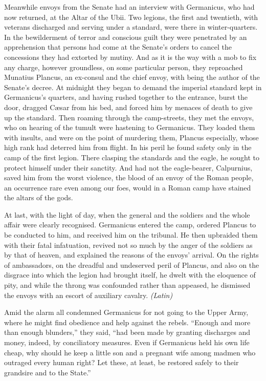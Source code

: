 
Meanwhile envoys from the Senate had an interview with Germanicus, who had now returned, at the Altar of the Ubii. Two legions, the first and twentieth, with veterans discharged and serving under a standard, were there in winter-quarters. In the bewilderment of terror and conscious guilt they were penetrated by an apprehension that persons had come at the Senate's orders to cancel the concessions they had extorted by mutiny. And as it is the way with a mob to fix any charge, however groundless, on some particular person, they reproached Munatius Plancus, an ex-consul and the chief envoy, with being the author of the Senate's decree. At midnight they began to demand the imperial standard kept in Germanicus's quarters, and having rushed together to the entrance, burst the door, dragged Cæsar from his bed, and forced him by menaces of death to give up the standard. Then roaming through the camp-streets, they met the envoys, who on hearing of the tumult were hastening to Germanicus. They loaded them with insults, and were on the point of murdering them, Plancus especially, whose high rank had deterred him from flight. In his peril he found safety only in the camp of the first legion. There clasping the standards and the eagle, he sought to protect himself under their sanctity. And had not the eagle-bearer, Calpurnius, saved him from the worst violence, the blood of an envoy of the Roman people, an occurrence rare even among our foes, would in a Roman camp have stained the altars of the gods.

At last, with the light of day, when the general and the soldiers and the whole affair were clearly recognised. Germanicus entered the camp, ordered Plancus to be conducted to him, and received him on the tribunal. He then upbraided them with their fatal infatuation, revived not so much by the anger of the soldiers as by that of heaven, and explained the reasons of the envoys' arrival. On the rights of ambassadors, on the dreadful and undeserved peril of Plancus, and also on the disgrace into which the legion had brought itself, he dwelt with the eloquence of pity, and while the throng was confounded rather than appeased, he dismissed the envoys with an escort of auxiliary cavalry. \emph{(Latin)}


Amid the alarm all condemned Germanicus for not going to the Upper Army, where he might find obedience and help against the rebels. ``Enough and more than enough blunders,'' they said, ``had been made by granting discharges and money, indeed, by conciliatory measures. Even if Germanicus held his own life cheap, why should he keep a little son and a pregnant wife among madmen who outraged every human right? Let these, at least, be restored safely to their grandsire and to the State.''

